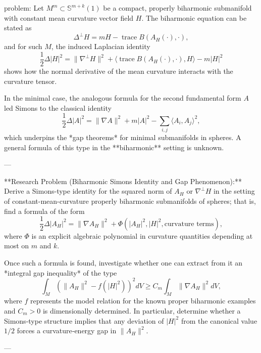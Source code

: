 problem:  
Let \(M^m \subset \mathbb{S}^{m+k}(1)\) be a compact, properly biharmonic submanifold with constant mean curvature vector field \(H\).  
The biharmonic equation can be stated as  
\[
\Delta^\perp H = mH - \operatorname{trace}B(A_H(\cdot),\cdot),
\]
and for such \(M\), the induced Laplacian identity  
\[
\frac{1}{2}\Delta |H|^2 = \|\nabla^\perp H\|^2 + \langle \operatorname{trace}B(A_H(\cdot),\cdot),H\rangle - m|H|^2
\]
shows how the normal derivative of the mean curvature interacts with the curvature tensor.  

In the minimal case, the analogous formula for the second fundamental form \(A\) led Simons to the classical identity  
\[
\frac{1}{2}\Delta |A|^2 = \|\nabla A\|^2 + m|A|^2 - \sum_{i,j}\langle A_i,A_j\rangle^2,
\]
which underpins the *gap theorems* for minimal submanifolds in spheres.  
A general formula of this type in the **biharmonic** setting is unknown.

---

**Research Problem (Biharmonic Simons Identity and Gap Phenomenon):**  
Derive a Simons-type identity for the squared norm of \(A_H\) or \(\nabla^\perp H\) in the setting of constant-mean-curvature properly biharmonic submanifolds of spheres; that is, find a formula of the form  
\[
\frac{1}{2}\Delta |A_H|^2 = \|\nabla A_H\|^2 + \Phi(|A_H|^2,|H|^2,\text{curvature terms}),
\]
where \(\Phi\) is an explicit algebraic polynomial in curvature quantities depending at most on \(m\) and \(k\).  

Once such a formula is found, investigate whether one can extract from it an *integral gap inequality* of the type  
\[
\int_M (\|A_H\|^2 - f(|H|^2))^2 dV \ge C_m \int_M \|\nabla A_H\|^2 dV,
\]
where \(f\) represents the model relation for the known proper biharmonic examples and \(C_m>0\) is dimensionally determined.  
In particular, determine whether a Simons-type structure implies that any deviation of \(|H|^2\) from the canonical value \(1/2\) forces a curvature‑energy gap in \(\|A_H\|^2\).

---

